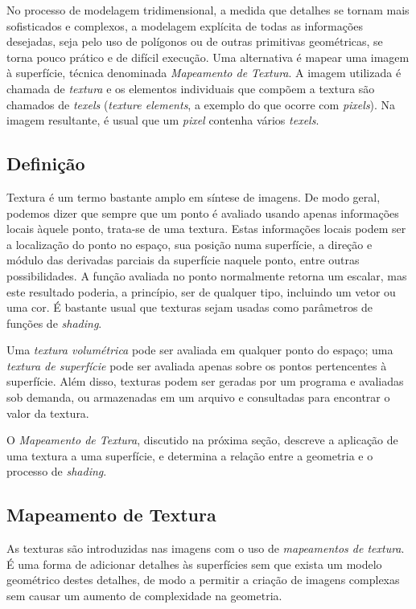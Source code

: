 No processo de modelagem tridimensional, a medida que detalhes se tornam mais sofisticados e complexos, a modelagem explícita de todas as informações desejadas, seja pelo uso de polígonos ou de outras primitivas geométricas, se torna pouco prático e de difícil execução. Uma alternativa é mapear uma imagem à superfície, técnica denominada {\it Mapeamento de Textura}. A imagem utilizada é chamada de {\it textura} e os elementos individuais que compõem a textura são chamados de {\it texels} (\emph{texture elements}, a exemplo do que ocorre com \emph{pixels}). Na imagem resultante, é usual que um \emph{pixel} contenha vários \emph{texels}.

\subsection{Definição}

Textura é um termo bastante amplo em síntese de imagens. De modo geral, podemos dizer que sempre que um ponto é avaliado usando apenas informações locais àquele ponto, trata-se de uma textura. Estas informações locais podem ser a localização do ponto no espaço, sua posição numa superfície, a direção e módulo das derivadas parciais da superfície naquele ponto, entre outras possibilidades. A função avaliada no ponto normalmente retorna um escalar, mas este resultado poderia, a princípio, ser de qualquer tipo, incluindo um vetor ou uma cor. É bastante usual que texturas sejam usadas como parâmetros de funções de {\it shading}.

Uma {\it textura volumétrica} pode ser avaliada em qualquer ponto do espaço; uma {\it textura de superfície} pode ser avaliada apenas sobre os pontos pertencentes à superfície. Além disso, texturas podem ser geradas por um programa e avaliadas sob demanda, ou armazenadas em um arquivo e consultadas para encontrar o valor da textura.

O {\it Mapeamento de Textura}, discutido na próxima seção, descreve a aplicação de uma textura a uma superfície, e determina a relação entre a geometria e o processo de {\it shading}.

\subsection{Mapeamento de Textura}

As texturas são introduzidas nas imagens com o uso de {\it mapeamentos de textura}. É uma forma de adicionar detalhes às superfícies sem que exista um modelo geométrico destes detalhes, de modo a permitir a criação de imagens complexas sem causar um aumento de complexidade na geometria.

